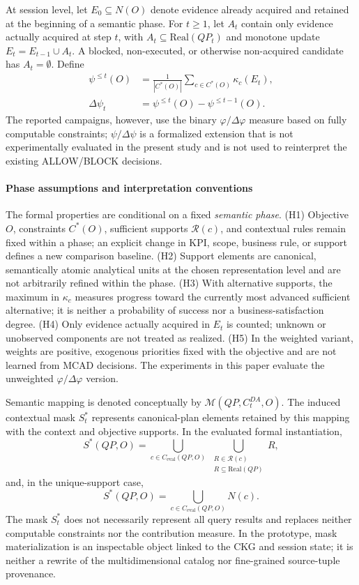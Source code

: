 \documentclass[journal]{IEEEtran}
\begin{document}
At session level, let $E_0\subseteq N(O)$ denote evidence already acquired and retained at the beginning of a semantic phase. For $t\ge1$, let $A_t$ contain only evidence actually acquired at step $t$, with $A_t\subseteq\mathrm{Real}(QP_t)$ and monotone update $E_t=E_{t-1}\cup A_t$. A blocked, non-executed, or otherwise non-acquired candidate has $A_t=\emptyset$. Define
\[
\begin{aligned}
\psi^{\le t}(O)&=\frac{1}{|C^*(O)|}\sum_{c\in C^*(O)}\kappa_c(E_t),\\
\Delta\psi_t&=\psi^{\le t}(O)-\psi^{\le t-1}(O).
\end{aligned}
\]
The reported campaigns, however, use the binary $\varphi/\Delta\varphi$ measure based on fully computable constraints; $\psi/\Delta\psi$ is a formalized extension that is not experimentally evaluated in the present study and is not used to reinterpret the existing ALLOW/BLOCK decisions.

\paragraph*{Phase assumptions and interpretation conventions}
The formal properties are conditional on a fixed \emph{semantic phase}. (H1) Objective $O$, constraints $C^*(O)$, sufficient supports $\mathcal R(c)$, and contextual rules remain fixed within a phase; an explicit change in KPI, scope, business rule, or support defines a new comparison baseline. (H2) Support elements are canonical, semantically atomic analytical units at the chosen representation level and are not arbitrarily refined within the phase. (H3) With alternative supports, the maximum in $\kappa_c$ measures progress toward the currently most advanced sufficient alternative; it is neither a probability of success nor a business-satisfaction degree. (H4) Only evidence actually acquired in $E_t$ is counted; unknown or unobserved components are not treated as realized. (H5) In the weighted variant, weights are positive, exogenous priorities fixed with the objective and are not learned from MCAD decisions. The experiments in this paper evaluate the unweighted $\varphi/\Delta\varphi$ version.

Semantic mapping is denoted conceptually by $\mathcal M(QP,C_t^{DA},O)$. The induced contextual mask $S_t^*$ represents canonical-plan elements retained by this mapping with the context and objective supports. In the evaluated formal instantiation,
\[
S^*(QP,O)=\bigcup_{c\in C_{\mathrm{eval}}(QP,O)}\ \bigcup_{\substack{R\in \mathcal{R}(c)\\R\subseteq \mathrm{Real}(QP)}} R,
\]
and, in the unique-support case,
\[
S^*(QP,O)=\bigcup_{c\in C_{\mathrm{eval}}(QP,O)} N(c).
\]
The mask $S_t^*$ does not necessarily represent all query results and replaces neither computable constraints nor the contribution measure. In the prototype, mask materialization is an inspectable object linked to the CKG and session state; it is neither a rewrite of the multidimensional catalog nor fine-grained source-tuple provenance.
\end{document}
